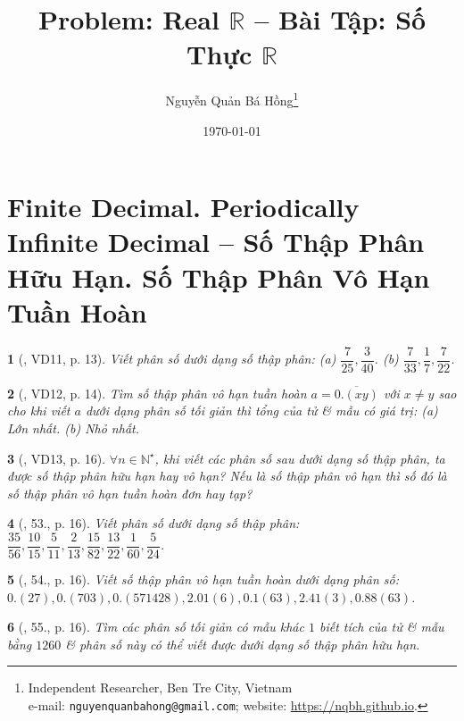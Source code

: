 \documentclass{article}
\title{Problem: Real $\mathbb{R}$ -- Bài Tập: Số Thực $\mathbb{R}$}
\author{Nguyễn Quản Bá Hồng\footnote{Independent Researcher, Ben Tre City, Vietnam\\e-mail: \texttt{nguyenquanbahong@gmail.com}; website: \url{https://nqbh.github.io}.}}
\date{\today}
\newtheorem{baitoan}{}
\begin{document}
\maketitle
\tableofcontents


\section{Finite Decimal. Periodically Infinite Decimal -- Số Thập Phân Hữu Hạn. Số Thập Phân Vô Hạn Tuần Hoàn}

\begin{baitoan}[\cite{Binh_Toan_7_tap_1}, VD11, p. 13]
	Viết phân số dưới dạng số thập phân: (a) $\dfrac{7}{25},\dfrac{3}{40}$. (b) $\dfrac{7}{33},\dfrac{1}{7},\dfrac{7}{22}$.
\end{baitoan}

\begin{baitoan}[\cite{Binh_Toan_7_tap_1}, VD12, p. 14]
	Tìm số thập phân vô hạn tuần hoàn $a = \overline{0.(xy)}$ với $x\ne y$ sao cho khi viết $a$ dưới dạng phân số tối giản thì tổng của tử \& mẫu có giá trị: (a) Lớn nhất. (b) Nhỏ nhất.
\end{baitoan}

\begin{baitoan}[\cite{Binh_Toan_7_tap_1}, VD13, p. 16]
	$\forall n\in\mathbb{N}^\star$, khi viết các phân số sau dưới dạng số thập phân, ta được số thập phân hữu hạn hay vô hạn? Nếu là số thập phân vô hạn thì số đó là số thập phân vô hạn tuần hoàn đơn hay tạp?
\end{baitoan}

\begin{baitoan}[\cite{Binh_Toan_7_tap_1}, 53., p. 16]
	Viết phân số dưới dạng số thập phân: $\dfrac{35}{56},\dfrac{10}{15},\dfrac{5}{11},\dfrac{2}{13},\dfrac{15}{82},\dfrac{13}{22},\dfrac{1}{60},\dfrac{5}{24}$.
\end{baitoan}

\begin{baitoan}[\cite{Binh_Toan_7_tap_1}, 54., p. 16]
	Viết số thập phân vô hạn tuần hoàn dưới dạng phân số: $0.(27),0.(703),0.(571428),2.01(6),0.1(63),2.41(3),0.88(63)$.
\end{baitoan}

\begin{baitoan}[\cite{Binh_Toan_7_tap_1}, 55., p. 16]
	Tìm các phân số tối giản có mẫu khác $1$ biết tích của tử \& mẫu bằng $1260$ \& phân số này có thể viết được dưới dạng số thập phân hữu hạn.
\end{baitoan}
\end{document}
